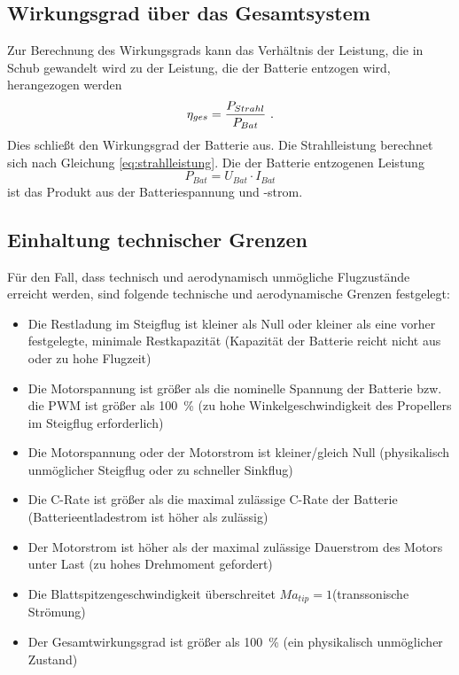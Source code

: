 \subsection{Wirkungsgrad über das Gesamtsystem}
\label{subsec:eta_ges}
Zur Berechnung des Wirkungsgrads kann das Verhältnis der Leistung, die in Schub gewandelt wird zu der Leistung, die der Batterie entzogen wird, herangezogen werden
\begin{equation}
	\eta_{ges} = \frac{P_{Strahl}}{P_{Bat}} ~\text{.}
\end{equation}
Dies schließt den Wirkungsgrad der Batterie aus.
Die Strahlleistung berechnet sich nach Gleichung \ref{eq:strahlleistung}.
Die der Batterie entzogenen Leistung
\begin{equation}
	P_{Bat} = U_{Bat}\cdot I_{Bat}
\end{equation}
ist das Produkt aus der Batteriespannung und -strom.


\subsection{Einhaltung technischer Grenzen}
\label{subsec:grenzen}
Für den Fall, dass technisch und aerodynamisch unmögliche Flugzustände erreicht werden, sind folgende technische und aerodynamische Grenzen festgelegt:
\begin{itemize}
	\item Die Restladung im Steigflug ist kleiner als  Null oder kleiner als eine vorher festgelegte, minimale Restkapazität (Kapazität der Batterie reicht nicht aus oder zu hohe Flugzeit)
	\item Die Motorspannung ist größer als die nominelle Spannung der Batterie bzw. die PWM ist größer als \SI{100}{\%} (zu hohe Winkelgeschwindigkeit des Propellers im Steigflug erforderlich)
	\item Die Motorspannung oder der Motorstrom ist kleiner/gleich Null (physikalisch unmöglicher Steigflug oder zu schneller Sinkflug)
	\item Die C-Rate ist größer als die maximal zulässige C-Rate der Batterie (Batterieentladestrom ist höher als zulässig)
	\item Der Motorstrom ist höher als der maximal zulässige Dauerstrom des Motors unter Last (zu hohes Drehmoment gefordert)
	\item Die Blattspitzengeschwindigkeit überschreitet \ensuremath{Ma_{tip}=1}\;(transsonische Strömung)
	\item Der Gesamtwirkungsgrad ist größer als \SI{100}{\%} \;(ein physikalisch unmöglicher Zustand)
\end{itemize}

